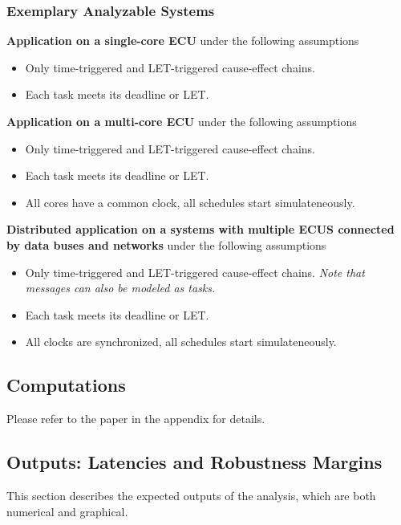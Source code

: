 



\subsubsection{Exemplary Analyzable Systems}
\label{sec:system-model-examples}

\textbf{Application on a single-core ECU} under the following assumptions
\begin{itemize}
	\item Only time-triggered and LET-triggered cause-effect chains.
	\item Each task meets its deadline or LET.
\end{itemize}

\textbf{Application on a multi-core ECU} under the following assumptions
\begin{itemize}
	\item Only time-triggered and LET-triggered cause-effect chains.
	\item Each task meets its deadline or LET.
	\item All cores have a common clock, all schedules start simulateneously.
\end{itemize}
%
\textbf{Distributed application on a systems with multiple ECUS connected by data buses and networks} under the following assumptions
	\begin{itemize}
	\item Only time-triggered and LET-triggered cause-effect chains. 
	\emph{Note that messages can also be modeled as tasks.}
	\item Each task meets its deadline or LET.
	\item All clocks are synchronized, all schedules start simulateneously.
\end{itemize} 
	


\subsection{Computations}
\label{sec:analysis}
Please refer to the paper in the appendix for details.



\subsection{Outputs: Latencies and Robustness Margins}
This section describes the expected outputs of the analysis, which are both numerical and graphical.


